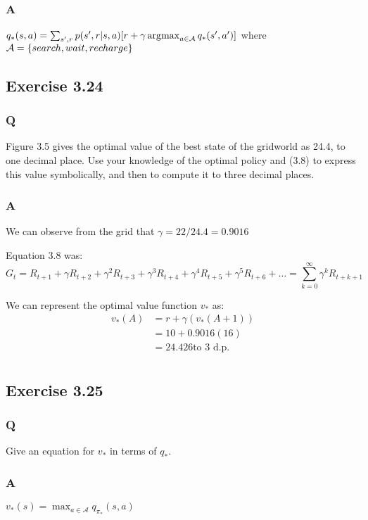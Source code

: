 \subsubsection*{A}
$
q_*(s,a) =  \sum_{s',r} p(s',r | s, a) [r + \gamma \operatorname*{\arg\!\max}_{a \in \mathcal{A}} q_*(s', a')]
$
where $\mathcal{A} = \{\mathnormal{search}, \mathnormal{wait}, \mathnormal{recharge}\}$

\subsection{Exercise 3.24}
\subsubsection*{Q}
Figure 3.5 gives the optimal value of the best state of the gridworld as 24.4, to one decimal place. Use your knowledge of the optimal policy and (3.8) to express this value symbolically, and then to compute it to three decimal places.

\subsubsection*{A}
We can observe from the grid that $\gamma = 22/24.4 = 0.9016$

Equation 3.8 was:
\begin{equation}
G_t = R_{t+1} + \gamma R_{t+2} + \gamma^2 R_{t+3} + \gamma^3 R_{t+4} + \gamma^4 R_{t+5} + \gamma^5 R_{t+6} + \ldots =  \sum_{k=0}^{\infty} \gamma^k R_{t+k+1}
\end{equation}

We can represent the optimal value function $v_*$ as:
\begin{align}
v_*(A) &= r + \gamma(v_*(A+1)) \\
 &= 10 + 0.9016(16) \\
 &= 24.426 \text{to 3 d.p.} \\
\end{align}

\subsection{Exercise 3.25}
\subsubsection*{Q}
Give an equation for $v_*$ in terms of $q_*$.

\subsubsection*{A}
$
v_*(s) = \max_{a \in \mathcal{A}} q_{\pi_*}(s,a)
$

